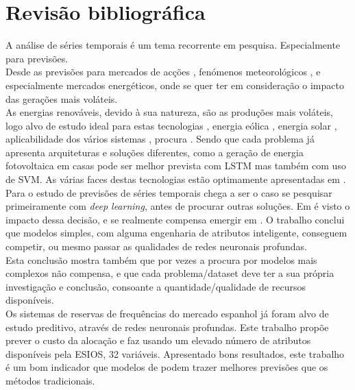 \chapter{Revisão bibliográfica}

A análise de séries temporais é um tema recorrente em pesquisa. Especialmente para previsões.\\
Desde as previsões para mercados de acções \cite{Bhandari2022}, fenómenos meteorológicos \cite{Wang2019}, e especialmente mercados energéticos, onde se quer ter em consideração o impacto das gerações mais voláteis.\\
As energias renováveis, devido à sua natureza, são as produções mais voláteis, logo alvo de estudo ideal para estas tecnologias \cite{Lu2015}, energia eólica \cite{Sun2022}, energia solar \cite{Rajasundrapandiyanleebanon2023}, aplicabilidade dos vários sistemas \cite{Ahmad2020}, procura \cite{Antonopoulos2020}.
Sendo que cada problema já apresenta arquiteturas e soluções diferentes, como a geração de energia fotovoltaica em casas pode ser melhor prevista com LSTM\cite{Costa2022} mas também com uso de SVM\cite{Meenal2018}. As várias faces destas tecnologias estão optimamente apresentadas em \cite{Benti2023}.\\


Para o estudo de previsões de séries temporais chega a ser o caso se pesquisar primeiramente com \textit{deep learning}, antes de procurar outras soluções. Em \cite{Elsayed} é visto o impacto dessa decisão, e se realmente compensa emergir em . O trabalho conclui que modelos simples, com alguma engenharia de atributos inteligente, conseguem competir, ou mesmo passar as qualidades de redes neuronais profundas. \\
Esta conclusão mostra também que por vezes a procura por modelos mais complexos não compensa, e que cada problema/dataset deve ter a sua própria investigação e conclusão, consoante a quantidade/qualidade de recursos disponíveis. \\


Os sistemas de reservas de frequências do mercado espanhol já foram alvo de estudo preditivo, através de redes neuronais profundas\cite{miota2023}. Este trabalho propõe prever o custo da alocação e faz usando um elevado número de atributos disponíveis pela ESIOS, 32 variáveis. Apresentado bons resultados, este trabalho é um bom indicador que modelos de  podem trazer melhores previsões que os métodos tradicionais.\\


